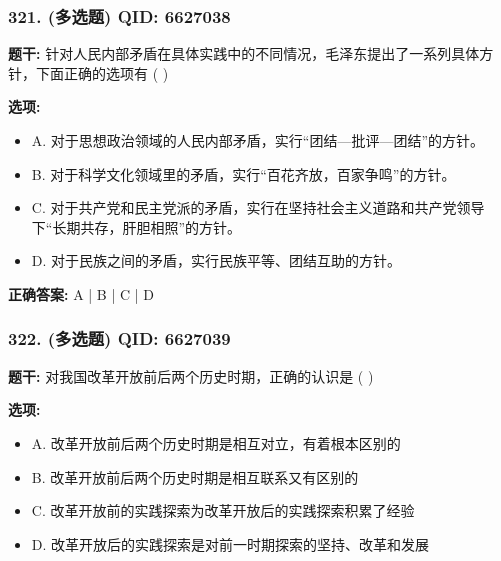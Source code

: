 \documentclass[12pt,UTF8]{ctexart}
\begin{document}
\subsubsection*{321. (多选题) \small QID: 6627038}

\textbf{题干:}
针对人民内部矛盾在具体实践中的不同情况，毛泽东提出了一系列具体方针，下面正确的选项有 ( )

\textbf{选项:}
\begin{itemize}[leftmargin=*]

  \item A. 对于思想政治领域的人民内部矛盾，实行“团结—批评—团结”的方针。

  \item B. 对于科学文化领域里的矛盾，实行“百花齐放，百家争鸣”的方针。

  \item C. 对于共产党和民主党派的矛盾，实行在坚持社会主义道路和共产党领导下“长期共存，肝胆相照”的方针。

  \item D. 对于民族之间的矛盾，实行民族平等、团结互助的方针。

\end{itemize}

\textbf{正确答案:}
A | B | C | D

\vspace{0.3em}\hrulefill\vspace{0.7em}

\subsubsection*{322. (多选题) \small QID: 6627039}

\textbf{题干:}
对我国改革开放前后两个历史时期，正确的认识是  ( )

\textbf{选项:}
\begin{itemize}[leftmargin=*]

  \item A. 改革开放前后两个历史时期是相互对立，有着根本区别的

  \item B. 改革开放前后两个历史时期是相互联系又有区别的

  \item C. 改革开放前的实践探索为改革开放后的实践探索积累了经验

  \item D. 改革开放后的实践探索是对前一时期探索的坚持、改革和发展

\end{itemize}
\end{document}
